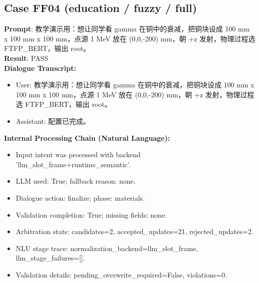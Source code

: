 \documentclass[11pt]{ctexart}
\begin{document}
\subsection{Case FF04 (education / fuzzy / full)}
\textbf{Prompt}: 教学演示用：想让同学看 gamma 在铜中的衰减，把铜块设成 100 mm x 100 mm x 100 mm，点源 1 MeV 放在 (0,0,-200) mm，朝 +z 发射，物理过程选 FTFP\_BERT，输出 root。\\
\textbf{Result}: PASS\\
\textbf{Dialogue Transcript:}
\begin{itemize}
\item User: 教学演示用：想让同学看 gamma 在铜中的衰减，把铜块设成 100 mm x 100 mm x 100 mm，点源 1 MeV 放在 (0,0,-200) mm，朝 +z 发射，物理过程选 FTFP\_BERT，输出 root。
\item Assistant: 配置已完成。
\end{itemize}
\textbf{Internal Processing Chain (Natural Language):}
\begin{itemize}
\item Input intent was processed with backend 'llm\_slot\_frame+runtime\_semantic'.
\item LLM used: True; fallback reason: none.
\item Dialogue action: finalize; phase: materials.
\item Validation completion: True; missing fields: none.
\item Arbitration stats: candidates=2, accepted\_updates=21, rejected\_updates=2.
\item NLU stage trace: normalization\_backend=llm\_slot\_frame, llm\_stage\_failures=[].
\item Validation details: pending\_overwrite\_required=False, violations=0.
\end{itemize}
\end{document}
